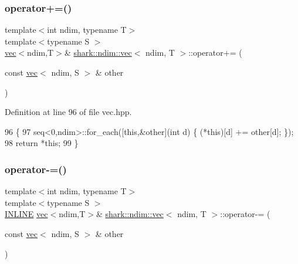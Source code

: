 \hypertarget{structshark_1_1ndim_1_1vec_af89f86b8ee43b2c1a0adb9bd8223d548}{}\label{structshark_1_1ndim_1_1vec_af89f86b8ee43b2c1a0adb9bd8223d548} 
\subsubsection{\texorpdfstring{operator+=()}{operator+=()}\hspace{0.1cm}{\footnotesize\ttfamily [2/2]}}
{\footnotesize\ttfamily template$<$int ndim, typename T$>$ \\
template$<$typename S $>$ \\
\hyperlink{structshark_1_1ndim_1_1vec}{vec}$<$ndim,T$>$\& \hyperlink{structshark_1_1ndim_1_1vec}{shark\+::ndim\+::vec}$<$ ndim, T $>$\+::operator+= (\begin{DoxyParamCaption}\item[{const \hyperlink{structshark_1_1ndim_1_1vec}{vec}$<$ ndim, S $>$ \&}]{other }\end{DoxyParamCaption})\hspace{0.3cm}{\ttfamily [inline]}}



Definition at line 96 of file vec.\+hpp.


\begin{DoxyCode}
96                                                                             \{
97             seq<0,ndim>::for\_each([\textcolor{keyword}{this},&other](\textcolor{keywordtype}{int} d) \{ (*this)[d] += other[d]; \});
98             \textcolor{keywordflow}{return} *\textcolor{keyword}{this};
99         \}
\end{DoxyCode}
\hypertarget{structshark_1_1ndim_1_1vec_a1fd95421a7d7d555f9e7861f807f79ab}{}\label{structshark_1_1ndim_1_1vec_a1fd95421a7d7d555f9e7861f807f79ab} 
\subsubsection{\texorpdfstring{operator-\/=()}{operator-=()}\hspace{0.1cm}{\footnotesize\ttfamily [1/2]}}
{\footnotesize\ttfamily template$<$int ndim, typename T$>$ \\
template$<$typename S $>$ \\
\hyperlink{common_8hpp_a2eb6f9e0395b47b8d5e3eeae4fe0c116}{I\+N\+L\+I\+NE} \hyperlink{structshark_1_1ndim_1_1vec}{vec}$<$ndim,T$>$\& \hyperlink{structshark_1_1ndim_1_1vec}{shark\+::ndim\+::vec}$<$ ndim, T $>$\+::operator-\/= (\begin{DoxyParamCaption}\item[{const \hyperlink{structshark_1_1ndim_1_1vec}{vec}$<$ ndim, S $>$ \&}]{other }\end{DoxyParamCaption})}

